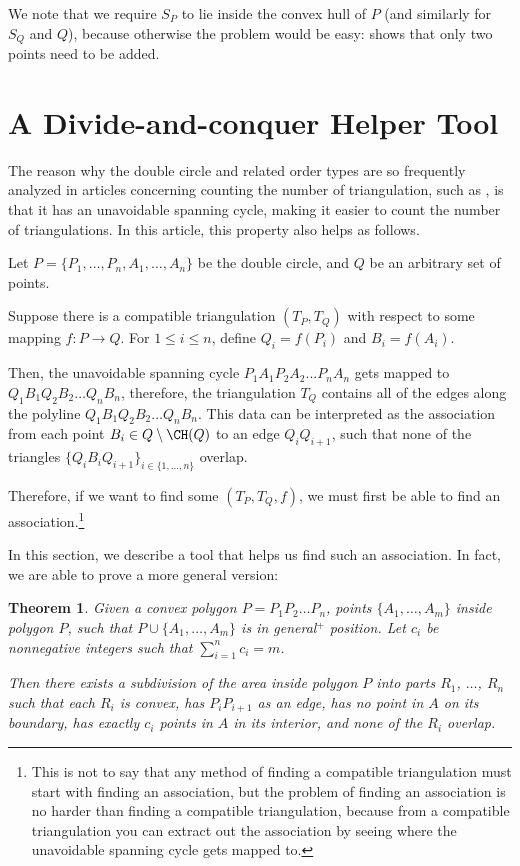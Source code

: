 \documentclass{article}
\theoremstyle{plain}
\newtheorem{theorem}       {Theorem}    [section]
\begin{document}
We note that we require
$S_P$ to lie inside the convex hull of $P$ (and similarly for $S_Q$ and $Q$), because otherwise the problem would be easy:
\cite[Theorem 3]{Danciger_2006} shows that only two points need to be added.

\section{A Divide-and-conquer Helper Tool}
\label{sec:divide_and_conquer}

The reason why the double circle and related order types are so frequently analyzed in
articles concerning counting the number of triangulation,
such as \cite{Rutschmann_2023,Dumitrescu_2013,Aichholzer2007,erkinger1998struktureigenschaften,HuNo97},
is that it has an unavoidable spanning cycle,
making it easier to count the number of triangulations.
In this article, this property also helps as follows.

Let $P = \{ P_1, \dots, P_n, A_1, \dots, A_n \}$ be the double circle,
and $Q$ be an arbitrary set of points.

Suppose there is a compatible triangulation $(T_P, T_Q)$ with respect to some mapping $f \colon P \to Q$.
For $1 \leq i \leq n$, define $Q_i = f(P_i)$ and $B_i = f(A_i)$.

Then, the unavoidable spanning cycle $P_1 A_1 P_2 A_2 \dots P_n A_n$
gets mapped to $Q_1 B_1 Q_2 B_2 \dots Q_n B_n$,
therefore, the triangulation $T_Q$ contains all of the edges along the polyline $Q_1 B_1 Q_2 B_2 \dots Q_n B_n$.
This data can be interpreted as the association from each point $B_i \in Q \setminus \CH(Q)$
to an edge $Q_i Q_{i+1}$,
such that none of the triangles $\{Q_i B_i Q_{i+1}\}_{i \in \{ 1, \dots, n \}}$ overlap.

Therefore, if we want to find some $(T_P, T_Q, f)$,
we must first be able to find an association.\footnote{
	This is not to say that any method of finding a compatible triangulation must start with finding an association,
	but the problem of finding an association is no harder than finding a compatible triangulation,
	because from a compatible triangulation you can extract out the association by
	seeing where the unavoidable spanning cycle gets mapped to.
}

In this section, we describe a tool that helps us find such an association.
In fact, we are able to prove a more general version:
\begin{theorem}
	\label{convex_subdivision}
	Given a convex polygon $P = P_1 P_2 \dots P_n$,
	points $\{A_1, \dots, A_m \}$ inside polygon $P$,
	such that $P \cup \{ A_1, \dots, A_m \}$ is in general$^+$ position.
	Let $c_i$ be nonnegative integers such that $\sum_{i=1}^n c_i = m$.

	Then there exists a subdivision of the area inside polygon $P$ into
	parts $R_1$, $\dots$, $R_n$
	such that each $R_i$ is convex, has $P_i P_{i+1}$ as an edge,
	has no point in $A$ on its boundary, has exactly $c_i$ points in $A$ in its interior,
	and none of the $R_i$ overlap.
\end{theorem}
\end{document}
